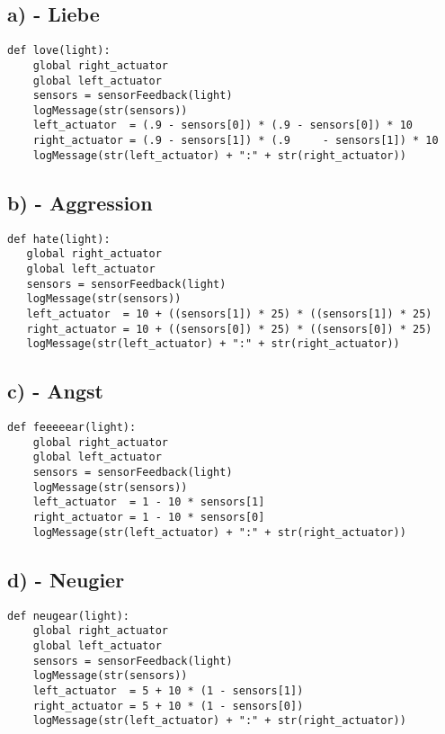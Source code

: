 \documentclass{./Vorlage/mat}
\begin{document}
\subsection*{a) - Liebe}
\begin{lstlisting}
def love(light):
    global right_actuator
    global left_actuator
    sensors = sensorFeedback(light)
    logMessage(str(sensors))
    left_actuator  = (.9 - sensors[0]) * (.9 - sensors[0]) * 10
    right_actuator = (.9 - sensors[1]) * (.9     - sensors[1]) * 10
    logMessage(str(left_actuator) + ":" + str(right_actuator))
\end{lstlisting}

\subsection*{b) - Aggression}
\begin{lstlisting}
def hate(light):
   global right_actuator
   global left_actuator
   sensors = sensorFeedback(light)
   logMessage(str(sensors))
   left_actuator  = 10 + ((sensors[1]) * 25) * ((sensors[1]) * 25)
   right_actuator = 10 + ((sensors[0]) * 25) * ((sensors[0]) * 25)
   logMessage(str(left_actuator) + ":" + str(right_actuator))
\end{lstlisting}

\subsection*{c) - Angst}
\begin{lstlisting}
def feeeeear(light):
    global right_actuator
    global left_actuator
    sensors = sensorFeedback(light)
    logMessage(str(sensors))
    left_actuator  = 1 - 10 * sensors[1]
    right_actuator = 1 - 10 * sensors[0]
    logMessage(str(left_actuator) + ":" + str(right_actuator))  
\end{lstlisting}


\subsection*{d) - Neugier}
\begin{lstlisting}
def neugear(light):
    global right_actuator
    global left_actuator
    sensors = sensorFeedback(light)
    logMessage(str(sensors))
    left_actuator  = 5 + 10 * (1 - sensors[1])
    right_actuator = 5 + 10 * (1 - sensors[0])
    logMessage(str(left_actuator) + ":" + str(right_actuator))
\end{lstlisting}
\end{document}
